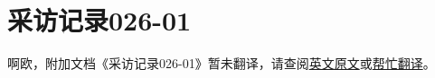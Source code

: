 \renewcommand{\DOCNAME}{采访记录026-01}
\renewcommand{\DOCSLUG}{interview-log-026-01}

\section{\DOCNAME}

\label{sec:DOC-\DOCSLUG}

啊欧，附加文档《\DOCNAME 》暂未翻译，请查阅\href{http://scp-wiki.wikidot.com/\DOCSLUG}{英文原文}或\href{http://scp-wiki-cn.wikidot.com/\DOCSLUG}{帮忙翻译}。
